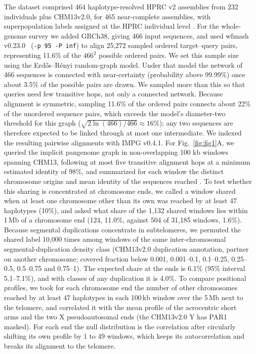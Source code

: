 \documentclass[pdflatex,mathphys]{jnl}
\begin{document}
The dataset comprised 464 haplotype-resolved HPRC v2 assemblies from 232
individuals plus CHM13v2.0, for 465 near-complete assemblies, with
superpopulation labels assigned at the HPRC individual level
\cite{hprc_hprcv2_2025,Nurk2022}. For the whole-genome survey we
added GRCh38, giving 466 input sequences, and used wfmash v0.23.0~\cite{wfmash}
(\texttt{-p 95 -P inf}) to align 25,272 sampled ordered target--query
pairs, representing 11.6\% of the $466^{2}$ possible ordered pairs.
We set this sample size using the Erd\H{o}s--R\'{e}nyi random-graph model.
Under that model the network of 466 sequences is connected with near-certainty
(probability above 99.99\%) once about 3.5\% of the possible pairs are drawn. We sampled more than
this so that queries need few transitive hops, not only a connected network. Because alignment is symmetric, sampling 11.6\% of the ordered pairs connects about 22\% of the unordered sequence pairs, which exceeds the model's diameter-two threshold for this graph ($\sqrt{2\ln(466)/466}\approx 16\%$); any two sequences are therefore expected to be linked through at most one intermediate. We indexed the resulting pairwise alignments with IMPG v0.4.1. For Fig.~\ref{fig:fig1}A, we queried the implicit pangenome graph in
non-overlapping 100 kb windows spanning CHM13, following at most five transitive
alignment hops at a minimum estimated identity of 98\%, and summarized for each
window the distinct chromosome origins and mean identity of the sequences reached
\cite{pangenome_graphs_impg_IMPG2023}.
To test whether this sharing is concentrated at chromosome ends, we called a window shared when at
least one chromosome other than its own was reached by at least 47 haplotypes (10\%), and asked
what share of the 1,132 shared windows lies within 1\,Mb of a chromosome end (124, 11.0\%, against
504 of 31,185 windows, 1.6\%). Because segmental duplications concentrate in subtelomeres, we
permuted the shared label 10,000 times among windows of the same inter-chromosomal
segmental-duplication density class (CHM13v2.0 duplication annotation, partner on another
chromosome; covered fraction below 0.001, 0.001--0.1, 0.1--0.25, 0.25--0.5, 0.5--0.75 and 0.75--1). The
expected share at the ends is 6.1\% (95\% interval 5.1--7.1\%), and with classes of any
duplication it is 4.0\%.
To compare positional profiles, we took for each chromosome end the number of other chromosomes
reached by at least 47 haplotypes in each 100\,kb window over the 5\,Mb next to the telomere, and
correlated it with the mean profile of the acrocentric short arms and the two X pseudoautosomal
ends (the CHM13v2.0 Y has PAR1 masked). For each end the null distribution is the correlation after
circularly shifting its own profile by 1 to 49 windows, which keeps its autocorrelation and breaks
its alignment to the telomere.
\end{document}
